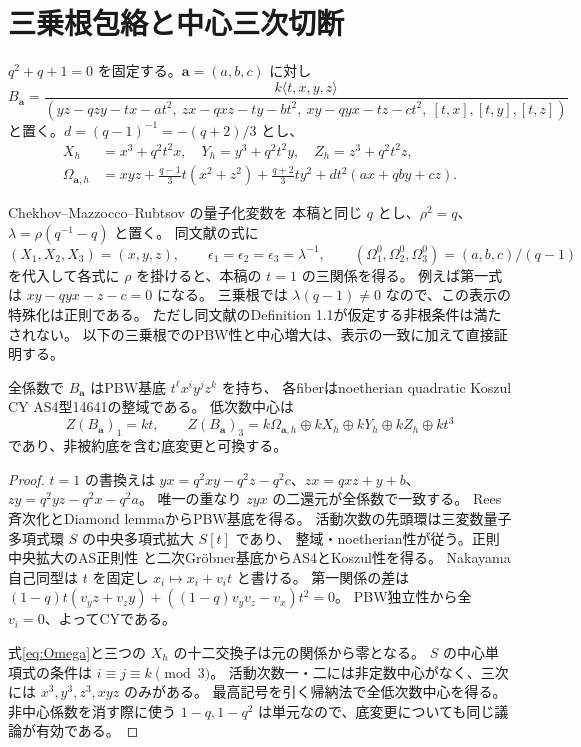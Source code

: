 \section{三乗根包絡と中心三次切断}\label{sec:seven}
$q^2+q+1=0$ を固定する。$\mathbf a=(a,b,c)$ に対し
\begin{equation}\label{eq:B}
B_{\mathbf a}=\frac{k\langle t,x,y,z\rangle}
{(yz-qzy-tx-at^2,\ zx-qxz-ty-bt^2,\ xy-qyx-tz-ct^2,\ [t,x],[t,y],[t,z])}
\end{equation}
と置く。$d=(q-1)^{-1}=-(q+2)/3$ とし、
\begin{align}
X_h&=x^3+q^2t^2x,\quad Y_h=y^3+q^2t^2y,\quad Z_h=z^3+q^2t^2z,\\
\Omega_{\mathbf a,h}&=xyz+\frac{q-1}{3}t(x^2+z^2)+\frac{q+2}{3}ty^2
                 +dt^2(ax+qby+cz).\label{eq:Omega}
\end{align}

\begin{remark}
Chekhov--Mazzocco--Rubtsov \cite[Definition 1.1, (1.5)]{CMR} の量子化変数を
本稿と同じ $q$ とし、$\rho^2=q$、$\lambda=\rho(q^{-1}-q)$ と置く。
同文献の式に
\[
 (X_1,X_2,X_3)=(x,y,z),\qquad
 \epsilon_1=\epsilon_2=\epsilon_3=\lambda^{-1},\qquad
 (\Omega_1^0,\Omega_2^0,\Omega_3^0)=(a,b,c)/(q-1)
\]
を代入して各式に $\rho$ を掛けると、本稿の $t=1$ の三関係を得る。
例えば第一式は $xy-qyx-z-c=0$ になる。
三乗根では $\lambda(q-1)\ne0$ なので、この表示の特殊化は正則である。
ただし同文献のDefinition 1.1が仮定する非根条件は満たされない。
以下の三乗根でのPBW性と中心増大は、表示の一致に加えて直接証明する。
\end{remark}

\begin{proposition}\label{prop:pbw}
全係数で $B_{\mathbf a}$ はPBW基底 $t^\ell x^iy^jz^k$ を持ち、
各fiberはnoetherian quadratic Koszul CY AS4型14641の整域である。
低次数中心は
\[
Z(B_{\mathbf a})_1=kt,\qquad
Z(B_{\mathbf a})_3=k\Omega_{\mathbf a,h}\oplus kX_h\oplus kY_h\oplus kZ_h\oplus kt^3
\]
であり、非被約底を含む底変更と可換する。
\end{proposition}
\begin{proof}
$t=1$ の書換えは
$yx=q^2xy-q^2z-q^2c$、$zx=qxz+y+b$、$zy=q^2yz-q^2x-q^2a$。
唯一の重なり $zyx$ の二還元が全係数で一致する。
Rees斉次化とDiamond lemmaからPBW基底を得る。
活動次数の先頭環は三変数量子多項式環 $S$ の中央多項式拡大 $S[t]$ であり、
整域・noetherian性が従う。正則中央拡大のAS正則性 \cite{LBS} と二次Gr\"obner基底からAS4とKoszul性を得る。
Nakayama自己同型は $t$ を固定し $x_i\mapsto x_i+v_it$ と書ける。
第一関係の差は
$(1-q)t(v_yz+v_zy)+((1-q)v_yv_z-v_x)t^2=0$。
PBW独立性から全 $v_i=0$、よってCYである。

式\eqref{eq:Omega}と三つの $X_h$ の十二交換子は元の関係から零となる。
$S$ の中心単項式の条件は $i\equiv j\equiv k\pmod3$。
活動次数一・二には非定数中心がなく、三次には $x^3,y^3,z^3,xyz$ のみがある。
最高記号を引く帰納法で全低次数中心を得る。
非中心係数を消す際に使う $1-q,1-q^2$ は単元なので、底変更についても同じ議論が有効である。
\end{proof}

